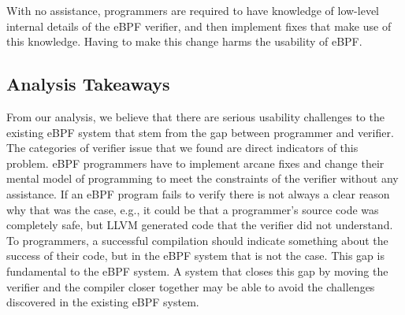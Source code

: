 With no assistance, programmers are required to have knowledge of low-level
    internal details of the eBPF verifier, and then implement fixes that
    make use of this knowledge.
Having to make this change harms the usability of eBPF.


\subsection{Analysis Takeaways}
From our analysis, we believe that there are serious usability challenges to the
    existing eBPF system that stem from the gap between programmer and verifier.
The categories of verifier issue that we found are direct indicators of this problem.
eBPF programmers have to implement arcane fixes and change their mental model of
    programming to meet the constraints of the verifier without any assistance.
If an eBPF program fails to verify there is not always a clear reason why that was the case, e.g.,
it could be that a programmer's source code was completely safe, but LLVM generated code that the verifier did not understand.
To programmers, a successful compilation should indicate something about the success of their code, but in the eBPF system that is not the case.
This gap is fundamental to the eBPF system.
A system that closes this gap by moving the verifier and the compiler closer together may be able to avoid the challenges discovered in the existing eBPF system.



